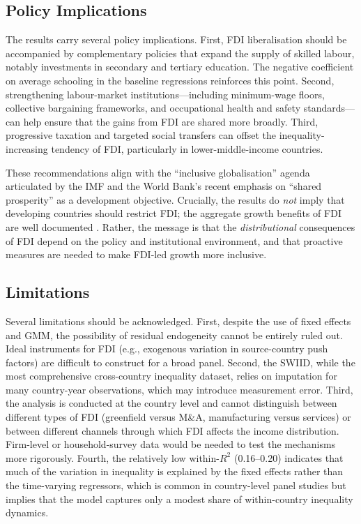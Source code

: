 \documentclass[12pt,a4paper]{article}
\begin{document}
\subsection{Policy Implications}

The results carry several policy implications.  First, FDI liberalisation should be accompanied by complementary policies that expand the supply of skilled labour, notably investments in secondary and tertiary education.  The negative coefficient on average schooling in the baseline regressions reinforces this point.  Second, strengthening labour-market institutions---including minimum-wage floors, collective bargaining frameworks, and occupational health and safety standards---can help ensure that the gains from FDI are shared more broadly.  Third, progressive taxation and targeted social transfers can offset the inequality-increasing tendency of FDI, particularly in lower-middle-income countries.

These recommendations align with the ``inclusive globalisation'' agenda articulated by the IMF \citep{Jaumotte2013} and the World Bank's recent emphasis on ``shared prosperity'' as a development objective.  Crucially, the results do \textit{not} imply that developing countries should restrict FDI; the aggregate growth benefits of FDI are well documented \citep{Alfaro2004}.  Rather, the message is that the \textit{distributional} consequences of FDI depend on the policy and institutional environment, and that proactive measures are needed to make FDI-led growth more inclusive.

\subsection{Limitations}

Several limitations should be acknowledged.  First, despite the use of fixed effects and GMM, the possibility of residual endogeneity cannot be entirely ruled out.  Ideal instruments for FDI (e.g., exogenous variation in source-country push factors) are difficult to construct for a broad panel.  Second, the SWIID, while the most comprehensive cross-country inequality dataset, relies on imputation for many country-year observations, which may introduce measurement error.  Third, the analysis is conducted at the country level and cannot distinguish between different types of FDI (greenfield versus M\&A, manufacturing versus services) or between different channels through which FDI affects the income distribution.  Firm-level or household-survey data would be needed to test the mechanisms more rigorously.  Fourth, the relatively low within-$R^2$ (0.16--0.20) indicates that much of the variation in inequality is explained by the fixed effects rather than the time-varying regressors, which is common in country-level panel studies but implies that the model captures only a modest share of within-country inequality dynamics.
\end{document}
